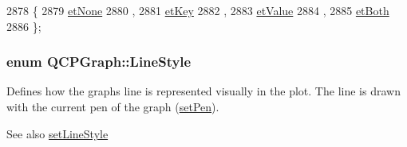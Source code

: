 \begin{DoxyCode}
2878                  \{
2879     \hyperlink{class_q_c_p_graph_ad23b514404bd2cb3216f57c90904d6afaeae745e7cc1766bb8546e35d4b76a711}{etNone} 
2880     ,
2881     \hyperlink{class_q_c_p_graph_ad23b514404bd2cb3216f57c90904d6afa2a5d89cd76fb8b6b18d71b8f6f6c0f43}{etKey} 
2882     ,
2883     \hyperlink{class_q_c_p_graph_ad23b514404bd2cb3216f57c90904d6afa147022ccdc49f6bd48f904cb4f61872e}{etValue} 
2884     ,
2885     \hyperlink{class_q_c_p_graph_ad23b514404bd2cb3216f57c90904d6afa761cb7d61670c1e2efecccd8974409ab}{etBoth} 
2886   \};
\end{DoxyCode}
\hypertarget{class_q_c_p_graph_ad60175cd9b5cac937c5ee685c32c0859}{}
\subsubsection[{Line\+Style}]{\setlength{\rightskip}{0pt plus 5cm}enum {\bf Q\+C\+P\+Graph\+::\+Line\+Style}}\label{class_q_c_p_graph_ad60175cd9b5cac937c5ee685c32c0859}
Defines how the graph\textquotesingle{}s line is represented visually in the plot. The line is drawn with the current pen of the graph (\hyperlink{class_q_c_p_abstract_plottable_ab74b09ae4c0e7e13142fe4b5bf46cac7}{set\+Pen}). \begin{DoxySeeAlso}{See also}
\hyperlink{class_q_c_p_graph_a513fecccff5b2a50ce53f665338c60ff}{set\+Line\+Style} 
\end{DoxySeeAlso}
